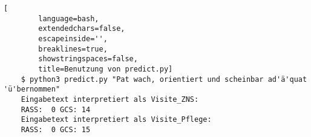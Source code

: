\begin{lstlisting}[
        language=bash,
        extendedchars=false,
        escapeinside='',
        breaklines=true,
        showstringspaces=false,
        title=Benutzung von predict.py]
    $ python3 predict.py "Pat wach, orientiert und scheinbar ad'ä'quat 'ü'bernommen"
    Eingabetext interpretiert als Visite_ZNS:
    RASS:  0 GCS: 14
    Eingabetext interpretiert als Visite_Pflege:
    RASS:  0 GCS: 15
\end{lstlisting}